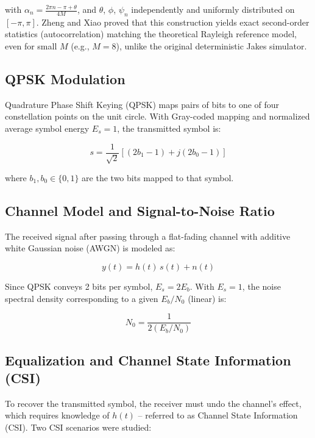\documentclass[12pt]{article}
\begin{document}
with $\alpha_n = \frac{2\pi n - \pi + \theta}{4M}$, and $\theta$,
$\phi$, $\psi_n$ independently and uniformly distributed on
$[-\pi,\pi]$. Zheng and Xiao proved that this construction
yields exact second-order statistics (autocorrelation) matching
the theoretical Rayleigh reference model, even for small $M$
(e.g., $M=8$), unlike the original deterministic Jakes
simulator.

\subsection{QPSK Modulation}

Quadrature Phase Shift Keying (QPSK) maps pairs of bits to one
of four constellation points on the unit circle. With
Gray-coded mapping and normalized average symbol energy
$E_s = 1$, the transmitted symbol is:

\begin{equation}
    s = \frac{1}{\sqrt{2}}\left[(2b_1-1) + j(2b_0-1)\right]
    \label{eq:qpsk_symbol}
\end{equation}

where $b_1, b_0 \in \{0,1\}$ are the two bits mapped to that
symbol.

\subsection{Channel Model and Signal-to-Noise Ratio}

The received signal after passing through a flat-fading channel
with additive white Gaussian noise (AWGN) is modeled as:

\begin{equation}
    y(t) = h(t)\,s(t) + n(t)
    \label{eq:channel_model}
\end{equation}

Since QPSK conveys 2 bits per symbol, $E_s = 2E_b$. With
$E_s=1$, the noise spectral density corresponding to a given
$E_b/N_0$ (linear) is:

\begin{equation}
    N_0 = \frac{1}{2(E_b/N_0)}
    \label{eq:n0}
\end{equation}

\subsection{Equalization and Channel State Information (CSI)}

To recover the transmitted symbol, the receiver must undo the
channel's effect, which requires knowledge of $h(t)$ --
referred to as Channel State Information (CSI). Two CSI
scenarios were studied:
\end{document}
